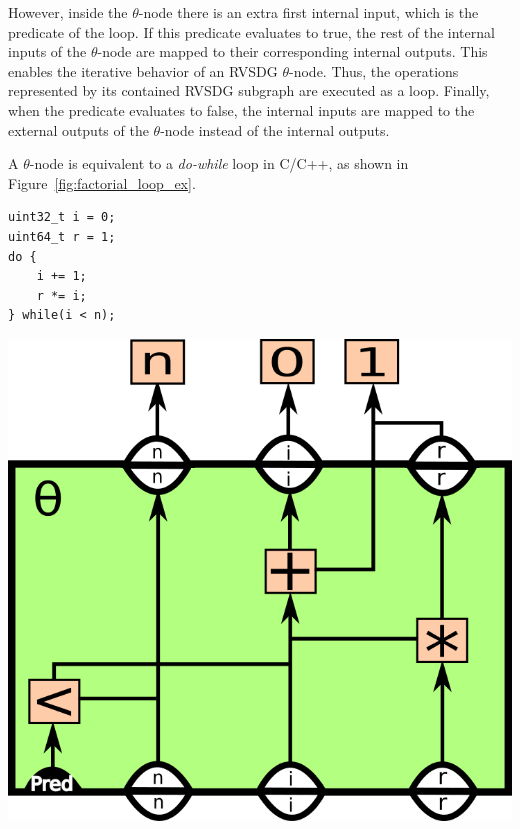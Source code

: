 \begin{itemize}
However, inside the $\theta$-node there is an extra first internal input, which
is the predicate of the  loop. If this predicate evaluates to
true, the rest of the internal inputs of the $\theta$-node are mapped to their
corresponding internal outputs. This enables the iterative behavior of an RVSDG
$\theta$-node. Thus, the operations represented by its contained RVSDG subgraph
are executed as a  loop. Finally, when the predicate evaluates to
false, the internal inputs are mapped to the external outputs of the
$\theta$-node instead of the internal outputs.

A $\theta$-node is equivalent to a \textit{do-while} loop in C/C++, as shown in
Figure~\ref{fig:factorial_loop_ex}.

\begin{centering}
	\noindent\begin{minipage}{0.36\textwidth}
		\begin{CenteredBox}
		\begin{lstlisting}[style=minipage_customcpp,
label={lst:fig:factorial_loop_ex}, basicstyle=\fontsize{10}{1}]
uint32_t i = 0;
uint64_t r = 1;
do {
	i += 1;
	r *= i;
} while(i < n);
		\end{lstlisting}
		\end{CenteredBox}
	\end{minipage}
	\noindent\begin{minipage}{0.55\textwidth}
		\captionsetup{type=figure}
		\includegraphics[width=\textwidth]{figures/svg/iterative_factorial_ex}
	\end{minipage}
	\label{fig:factorial_loop_ex}
\end{centering}


\end{itemize}

